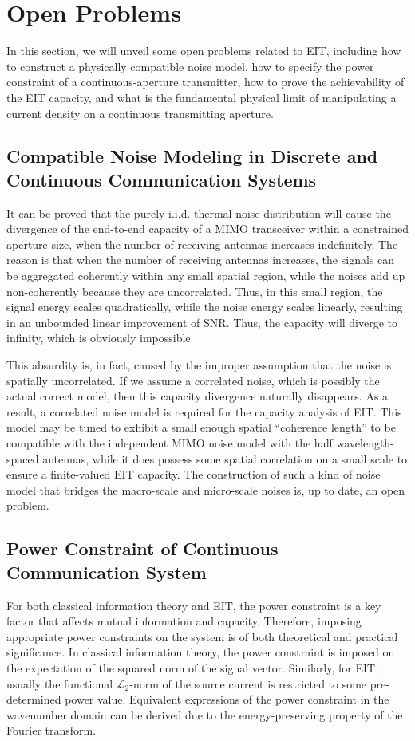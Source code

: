 \documentclass[journal,twocolumn]{IEEEtran}
\begin{document}
\section{Open Problems}
In this section, we will unveil some open problems related to EIT, including how to construct a physically compatible noise model, how to specify the power constraint of a continuous-aperture transmitter, how to prove the achievability of the EIT capacity, and what is the fundamental physical limit of manipulating a current density on a continuous transmitting aperture. 

\subsection{Compatible Noise Modeling in Discrete and Continuous Communication Systems}
It can be proved that the purely i.i.d. thermal noise distribution will cause the divergence of the end-to-end capacity of a MIMO transceiver within a constrained aperture size, when the number of receiving antennas increases indefinitely. 
The reason is that when the number of receiving antennas increases, the signals can be aggregated coherently within any small spatial region, while the noises add up non-coherently because they are uncorrelated. 
Thus, in this small region, the signal energy scales quadratically, while the noise energy scales linearly, resulting in an unbounded linear improvement of SNR. Thus, the capacity will diverge to infinity, which is obviously impossible.  

This absurdity is, in fact, caused by the improper assumption that the noise is spatially uncorrelated. 
If we assume a correlated noise, which is possibly the actual correct model, then this capacity divergence naturally disappears. 
As a result, a correlated noise model is required for the capacity analysis of EIT. This model may be tuned to exhibit a small enough spatial ``coherence length'' to be compatible with the independent MIMO noise model with the half wavelength-spaced antennas, while it does possess some spatial correlation on a small scale to ensure a finite-valued EIT capacity. 
The construction of such a kind of noise model that bridges the macro-scale and micro-scale noises is, up to date, an open problem. 

\subsection{Power Constraint of Continuous Communication System}
For both classical information theory and EIT, the power constraint is a key factor that affects mutual information and capacity. 
Therefore, imposing appropriate power constraints on the system is of both theoretical and practical significance. 
In classical information theory, the power constraint is imposed on the expectation of the squared norm of the signal vector.  
Similarly, for EIT, usually the functional $\mathcal{L}_2$-norm of the source current is restricted to some pre-determined power value. 
Equivalent expressions of the power constraint in the wavenumber domain can be derived due to the energy-preserving property of the Fourier transform. 
\end{document}
